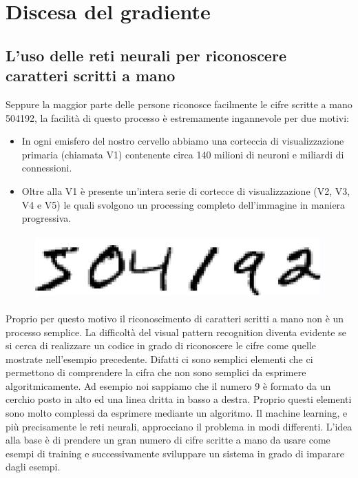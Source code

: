 \chapter{Discesa del gradiente}
\section{L’uso delle reti neurali per riconoscere caratteri scritti a mano}
Seppure la maggior parte delle persone riconosce facilmente le cifre scritte a mano 504192, la facilità di questo processo è estremamente ingannevole per due motivi:
\begin{itemize}
    \item In ogni emisfero del nostro cervello abbiamo una corteccia di visualizzazione primaria (chiamata V1) contenente circa 140 milioni di neuroni e miliardi di connessioni.
    \item Oltre alla V1 è presente un’intera serie di cortecce di visualizzazione (V2, V3, V4 e V5) le quali svolgono un processing completo dell’immagine in maniera progressiva.
\end{itemize}
\begin{figure}[!h]
    \includegraphics[scale=.5]{images/gradient_descent/digit.png}
    \centering
\end{figure}




Proprio per questo motivo il riconoscimento di caratteri scritti a mano non è un processo semplice.
La difficoltà del visual pattern recognition diventa evidente se si cerca di realizzare un codice in grado di riconoscere le cifre come quelle mostrate nell’esempio precedente. Difatti ci sono semplici elementi che ci permettono di comprendere la cifra che non sono semplici da esprimere algoritmicamente. Ad esempio noi sappiamo che il numero 9 è formato da un cerchio posto in alto ed una linea dritta in basso a destra. Proprio questi elementi sono molto complessi da esprimere mediante un algoritmo. 
Il machine learning, e più precisamente le reti neurali, approcciano il problema in modi differenti. L’idea alla base è di prendere un gran numero di cifre scritte a mano da usare come esempi di training e successivamente sviluppare un sistema in grado di imparare dagli esempi.
\newpage
